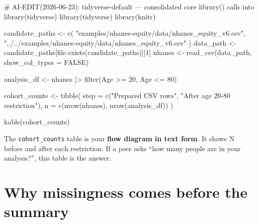 \documentclass[
  letterpaper,
  DIV=11,
  numbers=noendperiod,
  oneside]{scrreprt}
\newenvironment{Shaded}{\begin{snugshade}}{\end{snugshade}}
\newcommand{\AttributeTok}[1]{\textcolor[rgb]{0.40,0.45,0.13}{#1}}
\newcommand{\CommentTok}[1]{\textcolor[rgb]{0.37,0.37,0.37}{#1}}
\newcommand{\ConstantTok}[1]{\textcolor[rgb]{0.56,0.35,0.01}{#1}}
\newcommand{\DecValTok}[1]{\textcolor[rgb]{0.68,0.00,0.00}{#1}}
\newcommand{\FunctionTok}[1]{\textcolor[rgb]{0.28,0.35,0.67}{#1}}
\newcommand{\NormalTok}[1]{\textcolor[rgb]{0.00,0.23,0.31}{#1}}
\newcommand{\OtherTok}[1]{\textcolor[rgb]{0.00,0.23,0.31}{#1}}
\newcommand{\SpecialCharTok}[1]{\textcolor[rgb]{0.37,0.37,0.37}{#1}}
\newcommand{\StringTok}[1]{\textcolor[rgb]{0.13,0.47,0.30}{#1}}
\begin{document}
\begin{Shaded}
\begin{Highlighting}[numbers=left,,]
\CommentTok{\# AI{-}EDIT(2026{-}06{-}23): tidyverse{-}default — consolidated core library() calls into library(tidyverse)}
\FunctionTok{library}\NormalTok{(tidyverse)}
\FunctionTok{library}\NormalTok{(knitr)}

\NormalTok{candidate\_paths }\OtherTok{\textless{}{-}} \FunctionTok{c}\NormalTok{(}
  \StringTok{"examples/nhanes{-}equity/data/nhanes\_equity\_v6.csv"}\NormalTok{,}
  \StringTok{"../../examples/nhanes{-}equity/data/nhanes\_equity\_v6.csv"}
\NormalTok{)}
\NormalTok{data\_path }\OtherTok{\textless{}{-}}\NormalTok{ candidate\_paths[}\FunctionTok{file.exists}\NormalTok{(candidate\_paths)][}\DecValTok{1}\NormalTok{]}
\NormalTok{nhanes }\OtherTok{\textless{}{-}} \FunctionTok{read\_csv}\NormalTok{(data\_path, }\AttributeTok{show\_col\_types =} \ConstantTok{FALSE}\NormalTok{)}

\NormalTok{analysis\_df }\OtherTok{\textless{}{-}}\NormalTok{ nhanes }\SpecialCharTok{|\textgreater{}}
  \FunctionTok{filter}\NormalTok{(Age }\SpecialCharTok{\textgreater{}=} \DecValTok{20}\NormalTok{, Age }\SpecialCharTok{\textless{}=} \DecValTok{80}\NormalTok{)}

\NormalTok{cohort\_counts }\OtherTok{\textless{}{-}} \FunctionTok{tibble}\NormalTok{(}
  \AttributeTok{step =} \FunctionTok{c}\NormalTok{(}\StringTok{"Prepared CSV rows"}\NormalTok{, }\StringTok{"After age 20{-}80 restriction"}\NormalTok{),}
  \AttributeTok{n =} \FunctionTok{c}\NormalTok{(}\FunctionTok{nrow}\NormalTok{(nhanes), }\FunctionTok{nrow}\NormalTok{(analysis\_df))}
\NormalTok{)}

\FunctionTok{kable}\NormalTok{(cohort\_counts)}
\end{Highlighting}
\end{Shaded}

The \texttt{cohort\_counts} table is your \textbf{flow diagram in text
form}. It shows N before and after each restriction. If a peer asks
``how many people are in your analysis?'', this table is the answer.

\section*{Why missingness comes before the
summary}\label{why-missingness-comes-before-the-summary}

\end{document}
